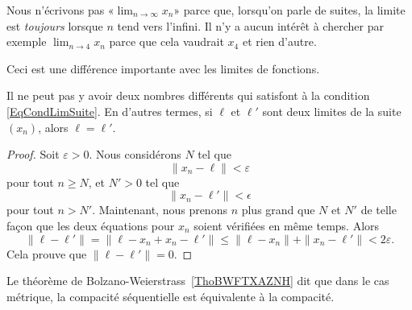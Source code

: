 \begin{remark}
	Nous n'écrivons pas «\( \lim_{n\to\infty}x_n\)» parce que, lorsqu'on parle de suites, la limite est \emph{toujours} lorsque \( n\) tend vers l'infini. Il n'y a aucun intérêt à chercher par exemple \( \lim_{n\to 4}x_n\) parce que cela vaudrait \( x_4\) et rien d'autre.

	Ceci est une différence importante avec les limites de fonctions.
\end{remark}

\begin{lemma}
	Il ne peut pas y avoir deux nombres différents qui satisfont à la condition \eqref{EqCondLimSuite}. En d'autres termes, si \( \ell\) et \( \ell'\) sont deux limites de la suite \( (x_n)\), alors \( \ell=\ell'\).
\end{lemma}

\begin{proof}
	Soit \( \varepsilon>0\). Nous considérons \( N\) tel que
	\begin{equation}
		\| x_n-\ell \|<\varepsilon
	\end{equation}
	pour tout \( n\geq N\), et \( N'>0\) tel que
	\begin{equation}
		\| x_n-\ell' \|<\epsilon
	\end{equation}
	pour tout \( n>N'\). Maintenant, nous prenons \( n\) plus grand que \( N\) et \( N'\) de telle façon que les deux équations pour \( x_n\) soient vérifiées en même temps. Alors
	\begin{equation}
		\| \ell-\ell' \|=\| \ell-x_n+x_n-\ell' \|\leq\| \ell-x_n \|+\| x_n-\ell' \|<2\varepsilon.
	\end{equation}
	Cela prouve que \( \| \ell-\ell' \|=0\).
\end{proof}
Le théorème de Bolzano-Weierstrass~\ref{ThoBWFTXAZNH} dit que dans le cas métrique, la compacité séquentielle est équivalente à la compacité.

